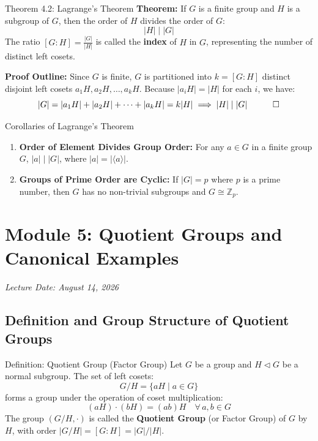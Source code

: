 \documentclass[11pt,a4paper]{article}
\begin{document}
\begin{formulabox}{Theorem 4.2: Lagrange's Theorem}
\textbf{Theorem:} If $G$ is a finite group and $H$ is a subgroup of $G$, then the order of $H$ divides the order of $G$:
\begin{equation}
    |H| \;\Big|\; |G|
\end{equation}
The ratio $[G : H] = \frac{|G|}{|H|}$ is called the \textbf{index} of $H$ in $G$, representing the number of distinct left cosets.

\textbf{Proof Outline:} Since $G$ is finite, $G$ is partitioned into $k = [G:H]$ distinct disjoint left cosets $a_1 H, a_2 H, \dots, a_k H$. Because $|a_i H| = |H|$ for each $i$, we have:
$$|G| = |a_1 H| + |a_2 H| + \dots + |a_k H| = k |H| \implies |H| \mid |G| \quad \qed$$
\end{formulabox}

\begin{defbox}{Corollaries of Lagrange's Theorem}
\begin{enumerate}
    \item \textbf{Order of Element Divides Group Order:} For any $a \in G$ in a finite group $G$, $|a| \mid |G|$, where $|a| = |\langle a \rangle|$.
    \item \textbf{Groups of Prime Order are Cyclic:} If $|G| = p$ where $p$ is a prime number, then $G$ has no non-trivial subgroups and $G \cong \mathbb{Z}_p$.
\end{enumerate}
\end{defbox}

\newpage

\section{Module 5: Quotient Groups and Canonical Examples}
\textit{Lecture Date: August 14, 2026}

\subsection{Definition and Group Structure of Quotient Groups}

\begin{defbox}{Definition: Quotient Group (Factor Group)}
Let $G$ be a group and $H \triangleleft G$ be a normal subgroup. The set of left cosets:
\begin{equation}
    G/H = \{ aH \mid a \in G \}
\end{equation}
forms a group under the operation of coset multiplication:
\begin{equation}
    (aH) \cdot (bH) = (ab)H \quad \forall\, a, b \in G
\end{equation}
The group $(G/H, \cdot)$ is called the \textbf{Quotient Group} (or Factor Group) of $G$ by $H$, with order $|G/H| = [G : H] = |G|/|H|$.
\end{defbox}
\end{document}
